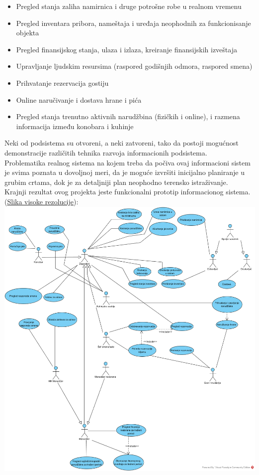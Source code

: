 \documentclass{article}
\begin{document}
\begin{itemize}
\item Pregled stanja zaliha namirnica i druge potrošne robe u realnom vremenu
\item Pregled inventara pribora, nameštaja i uređaja neophodnih za funkcionisanje objekta
\item Pregled finansijskog stanja, ulaza i izlaza, kreiranje finansijskih izveštaja
\item Upravljanje ljudskim resursima (raspored godišnjih odmora, raspored smena)
\item Prihvatanje rezervacija gostiju
\item Online naručivanje i dostava hrane i pića
\item Pregled stanja trenutno aktivnih narudžbina (fizičkih i online), i razmena informacija između konobara i kuhinje
\end{itemize}

Neki od podsistema su otvoreni, a neki zatvoreni, tako da postoji mogućnost demonstracije različitih tehnika razvoja
informacionih podsistema.\\

Problematika realnog sistema na kojem treba da počiva ovaj informacioni sistem je svima poznata u dovoljnoj meri, da je moguće izvršiti inicijalno planiranje u grubim crtama, dok je za detaljniji plan neophodno terensko istraživanje.\\

Krajnji rezultat ovog projekta jeste funkcionalni prototip informacionog sistema. (\href{https://raw.githubusercontent.com/bozidarrr/NajmanjiProblem/master/FinalniDokument/SU_0_grupni.png}{Slika visoke rezolucije}):\\

\includegraphics[width=\textwidth]{SU_0_grupni.png}
\end{document}
